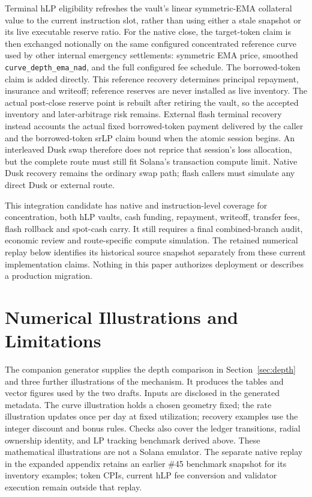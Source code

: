 Terminal hLP eligibility refreshes the vault's linear symmetric-EMA collateral value to the current instruction slot, rather than using either a stale snapshot or its live executable reserve ratio. For the native close, the target-token claim is then exchanged notionally on the same configured concentrated reference curve used by other internal emergency settlements: symmetric EMA price, smoothed \texttt{curve\_depth\_ema\_nad}, and the full configured fee schedule. The borrowed-token claim is added directly. This reference recovery determines principal repayment, insurance and writeoff; reference reserves are never installed as live inventory. The actual post-close reserve point is rebuilt after retiring the vault, so the accepted inventory and later-arbitrage risk remains. External flash terminal recovery instead accounts the actual fixed borrowed-token payment delivered by the caller and the borrowed-token srLP claim bound when the atomic session begins. An interleaved Dusk swap therefore does not reprice that session's loss allocation, but the complete route must still fit Solana's transaction compute limit. Native Dusk recovery remains the ordinary swap path; flash callers must simulate any direct Dusk or external route.

This integration candidate has native and instruction-level coverage for concentration, both hLP vaults, cash funding, repayment, writeoff, transfer fees, flash rollback and spot-cash carry. It still requires a final combined-branch audit, economic review and route-specific compute simulation. The retained numerical replay below identifies its historical source snapshot separately from these current implementation claims. Nothing in this paper authorizes deployment or describes a production migration.


\section{Numerical Illustrations and Limitations}

The companion generator supplies the depth comparison in Section~\ref{sec:depth} and three further illustrations of the mechanism. It produces the tables and vector figures used by the two drafts. Inputs are disclosed in the generated metadata. The curve illustration holds a chosen geometry fixed; the rate illustration updates once per day at fixed utilization; recovery examples use the integer discount and bonus rules. Checks also cover the ledger transitions, radial ownership identity, and LP tracking benchmark derived above. These mathematical illustrations are not a Solana emulator. The separate native replay in the expanded appendix retains an earlier \#45 benchmark snapshot for its inventory examples; token CPIs, current hLP fee conversion and validator execution remain outside that replay.


